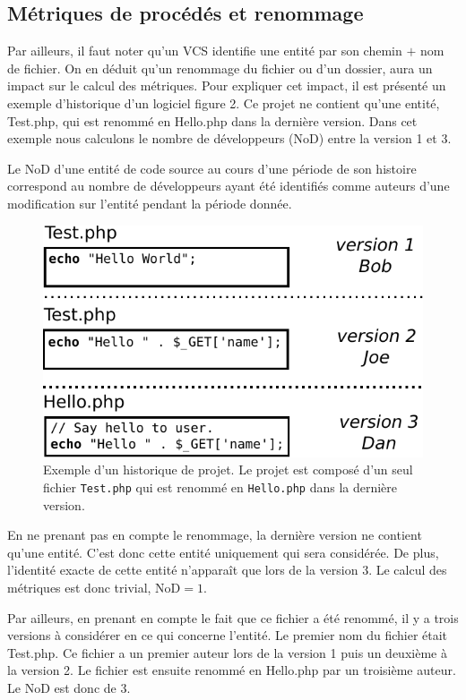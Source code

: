 \subsection{Métriques de procédés et renommage}

Par ailleurs, il faut noter qu'un VCS identifie une entité par son chemin $+$ nom de fichier. On en déduit qu'un renommage du fichier ou d'un dossier, aura un impact sur le calcul des métriques. Pour expliquer cet impact, il est présenté un exemple d'historique d'un logiciel figure 2. Ce projet ne contient qu'une entité, Test.php, qui est renommé en Hello.php dans la dernière version. Dans cet exemple nous calculons le nombre de développeurs (NoD) entre la version 1 et 3.

Le NoD d'une entité de code source au cours d'une période de son histoire correspond au nombre de développeurs ayant été identifiés comme auteurs d'une modification sur l'entité pendant la période donnée.\\

\begin{figure}[t]
	\centering
	\includegraphics[width=0.8\linewidth,keepaspectratio]{data/figures/example.pdf}
	\caption{Exemple d'un historique de projet. Le projet est composé d'un seul fichier \texttt{Test.php} qui est renommé en \texttt{Hello.php} dans la dernière version.}
	\label{fig:example}
\end{figure}
En ne prenant pas en compte le renommage, la dernière version ne contient qu'une entité. C'est donc cette entité uniquement qui sera considérée. De plus, l'identité exacte de cette entité n'apparaît que lors de la version 3. Le calcul des métriques est donc trivial, NoD$ = 1$.

Par ailleurs, en prenant en compte le fait que ce fichier a été renommé, il y a trois versions à considérer en ce qui concerne l'entité. Le premier nom du fichier était Test.php. Ce fichier a un premier auteur lors de la version 1 puis un deuxième à la version 2. Le fichier est ensuite renommé en Hello.php par un troisième auteur. Le NoD est donc de 3.\\


